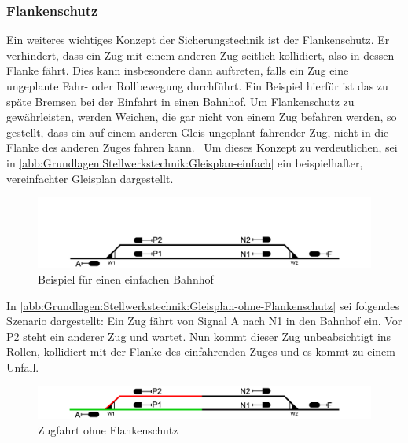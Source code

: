 \subsubsection*{Flankenschutz}\label{text:Grundlagen:Stellwerkstechnik:Sicherung-des-Schienenverkehrs:Flankenschutz}

Ein weiteres wichtiges Konzept der Sicherungstechnik ist der Flankenschutz. Er verhindert, dass ein Zug mit einem anderen Zug seitlich kollidiert, also in dessen Flanke fährt. Dies kann insbesondere dann auftreten, falls ein Zug eine ungeplante Fahr- oder Rollbewegung durchführt. Ein Beispiel hierfür ist das zu späte Bremsen bei der Einfahrt in einen Bahnhof. Um Flankenschutz zu gewährleisten, werden Weichen, die gar nicht von einem Zug befahren werden, so gestellt, dass ein auf einem anderen Gleis ungeplant fahrender Zug, nicht in die Flanke des anderen Zuges fahren kann.~\cite[][S.119 ff.]{bib:Sicherung-des-Schienenverkehrs} Um dieses Konzept zu verdeutlichen, sei in \autoref{abb:Grundlagen:Stellwerkstechnik:Gleisplan-einfach} ein beispielhafter, vereinfachter Gleisplan dargestellt.

\begin{figure}[H]
    \centering
    \includegraphics[width=\textwidth]{Assets/Images/2-Grundlagen/Gleisplan-Einfacher-Bahnhof-Nur-Gleisplan.png}
    \caption{Beispiel für einen einfachen Bahnhof}\label{abb:Grundlagen:Stellwerkstechnik:Gleisplan-einfach}
\end{figure}

In \autoref{abb:Grundlagen:Stellwerkstechnik:Gleisplan-ohne-Flankenschutz} sei folgendes Szenario dargestellt: Ein Zug fährt von Signal A nach N1 in den Bahnhof ein. Vor P2 steht ein anderer Zug und wartet. Nun kommt dieser Zug unbeabsichtigt ins Rollen, kollidiert mit der Flanke des einfahrenden Zuges und es kommt zu einem Unfall.

\begin{figure}[H]
    \centering
    \includegraphics[width=\textwidth]{Assets/Images/2-Grundlagen/Gleisplan-Einfacher-Bahnhof-Ohne-Flankenschutz.png}
    \caption{Zugfahrt ohne Flankenschutz}\label{abb:Grundlagen:Stellwerkstechnik:Gleisplan-ohne-Flankenschutz}
\end{figure}

